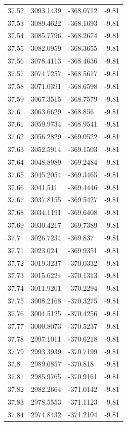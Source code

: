 \begin{table}[H]
\begin{tabular}{llll}
37.52 & 3093.1439 & -368.0712 & -9.81 \\
37.53 & 3089.4622 & -368.1693 & -9.81 \\
37.54 & 3085.7796 & -368.2674 & -9.81 \\
37.55 & 3082.0959 & -368.3655 & -9.81 \\
37.56 & 3078.4113 & -368.4636 & -9.81 \\
37.57 & 3074.7257 & -368.5617 & -9.81 \\
37.58 & 3071.0391 & -368.6598 & -9.81 \\
37.59 & 3067.3515 & -368.7579 & -9.81 \\
37.6 & 3063.6629 & -368.856 & -9.81 \\
37.61 & 3059.9734 & -368.9541 & -9.81 \\
37.62 & 3056.2829 & -369.0522 & -9.81 \\
37.63 & 3052.5914 & -369.1503 & -9.81 \\
37.64 & 3048.8989 & -369.2484 & -9.81 \\
37.65 & 3045.2054 & -369.3465 & -9.81 \\
37.66 & 3041.511 & -369.4446 & -9.81 \\
37.67 & 3037.8155 & -369.5427 & -9.81 \\
37.68 & 3034.1191 & -369.6408 & -9.81 \\
37.69 & 3030.4217 & -369.7389 & -9.81 \\
37.7 & 3026.7234 & -369.837 & -9.81 \\
37.71 & 3023.024 & -369.9351 & -9.81 \\
37.72 & 3019.3237 & -370.0332 & -9.81 \\
37.73 & 3015.6224 & -370.1313 & -9.81 \\
37.74 & 3011.9201 & -370.2294 & -9.81 \\
37.75 & 3008.2168 & -370.3275 & -9.81 \\
37.76 & 3004.5125 & -370.4256 & -9.81 \\
37.77 & 3000.8073 & -370.5237 & -9.81 \\
37.78 & 2997.1011 & -370.6218 & -9.81 \\
37.79 & 2993.3939 & -370.7199 & -9.81 \\
37.8 & 2989.6857 & -370.818 & -9.81 \\
37.81 & 2985.9765 & -370.9161 & -9.81 \\
37.82 & 2982.2664 & -371.0142 & -9.81 \\
37.83 & 2978.5553 & -371.1123 & -9.81 \\
37.84 & 2974.8432 & -371.2104 & -9.81 \\

\end{tabular}
\end{table}
